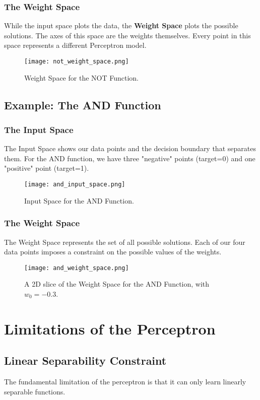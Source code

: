 \subsubsection{The Weight Space}
While the input space plots the data, the \textbf{Weight Space} plots the possible solutions. The axes of this space are the weights themselves. Every point in this space represents a different Perceptron model.
\begin{figure}[h!]
\centering
\texttt{[image: not\_weight\_space.png]}
\caption{Weight Space for the NOT Function.}
\end{figure}

\subsection{Example: The AND Function}
\subsubsection{The Input Space}
The Input Space shows our data points and the decision boundary that separates them. For the AND function, we have three "negative" points (target=0) and one "positive" point (target=1).
\begin{figure}[h!]
\centering
\texttt{[image: and\_input\_space.png]}
\caption{Input Space for the AND Function.}
\end{figure}

\subsubsection{The Weight Space}
The Weight Space represents the set of all possible solutions. Each of our four data points imposes a constraint on the possible values of the weights.
\begin{figure}[h!]
\centering
\texttt{[image: and\_weight\_space.png]}
\caption{A 2D slice of the Weight Space for the AND Function, with \(w_0 = -0.3\).}
\end{figure}

\section{Limitations of the Perceptron}
\subsection{Linear Separability Constraint}
The fundamental limitation of the perceptron is that it can only learn linearly separable functions.


